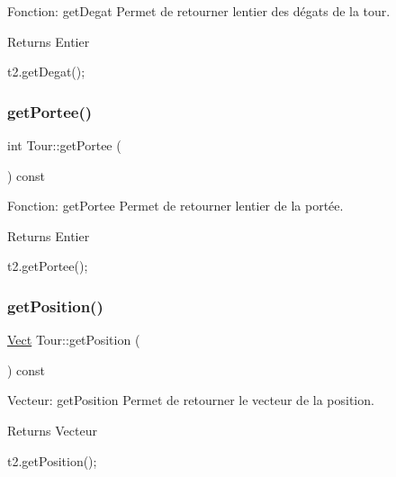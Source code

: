 Fonction\+: get\+Degat Permet de retourner l\textquotesingle{}entier des dégats de la tour. 

\begin{DoxyReturn}{Returns}
Entier 
\begin{DoxyCode}
t2.getDegat();
\end{DoxyCode}
 
\end{DoxyReturn}
\mbox{\label{classTour_a5673a20fed27ffce9d299344dbe87d8d}} 
\subsubsection{\texorpdfstring{get\+Portee()}{getPortee()}}
{\footnotesize\ttfamily int Tour\+::get\+Portee (\begin{DoxyParamCaption}{ }\end{DoxyParamCaption}) const}



Fonction\+: get\+Portee Permet de retourner l\textquotesingle{}entier de la portée. 

\begin{DoxyReturn}{Returns}
Entier 
\begin{DoxyCode}
t2.getPortee();
\end{DoxyCode}
 
\end{DoxyReturn}
\mbox{\label{classTour_a4645c52ba7bf31afcf6d80f04f382db9}} 
\subsubsection{\texorpdfstring{get\+Position()}{getPosition()}}
{\footnotesize\ttfamily \hyperlink{classVect}{Vect} Tour\+::get\+Position (\begin{DoxyParamCaption}{ }\end{DoxyParamCaption}) const}



Vecteur\+: get\+Position Permet de retourner le vecteur de la position. 

\begin{DoxyReturn}{Returns}
Vecteur 
\begin{DoxyCode}
t2.getPosition();
\end{DoxyCode}
 
\end{DoxyReturn}
\mbox{\label{classTour_ac37676f670ba4235601de5c3c4ff791c}} 
